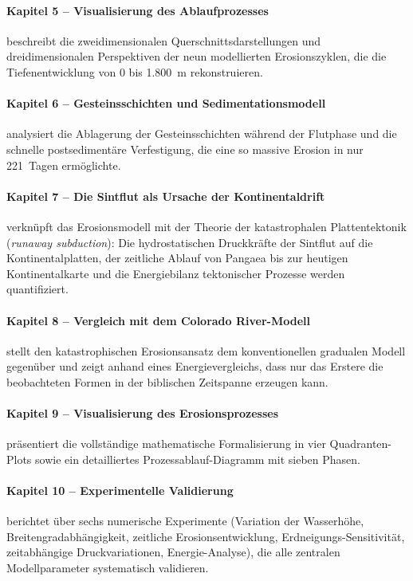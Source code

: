 ﻿\documentclass[12pt,a4paper]{report}
\begin{document}
\paragraph{Kapitel 5 -- Visualisierung des Ablaufprozesses}
beschreibt die zweidimensionalen Querschnittsdarstellungen und dreidimensionalen Perspektiven der neun modellierten Erosionszyklen, die die Tiefenentwicklung von 0 bis 1.800~m rekonstruieren.

\paragraph{Kapitel 6 -- Gesteinsschichten und Sedimentationsmodell}
analysiert die Ablagerung der Gesteinsschichten während der Flutphase und die schnelle postsedimentäre Verfestigung, die eine so massive Erosion in nur 221~Tagen ermöglichte.

\paragraph{Kapitel 7 -- Die Sintflut als Ursache der Kontinentaldrift}
verknüpft das Erosionsmodell mit der Theorie der katastrophalen Plattentektonik (\textit{runaway subduction}): Die hydrostatischen Druckkräfte der Sintflut auf die Kontinentalplatten, der zeitliche Ablauf von Pangaea bis zur heutigen Kontinentalkarte und die Energiebilanz tektonischer Prozesse werden quantifiziert.

\paragraph{Kapitel 8 -- Vergleich mit dem Colorado River-Modell}
stellt den katastrophischen Erosionsansatz dem konventionellen gradualen Modell gegenüber und zeigt anhand eines Energievergleichs, dass nur das Erstere die beobachteten Formen in der biblischen Zeitspanne erzeugen kann.

\paragraph{Kapitel 9 -- Visualisierung des Erosionsprozesses}
präsentiert die vollständige mathematische Formalisierung in vier Quadranten-Plots sowie ein detailliertes Prozessablauf-Diagramm mit sieben Phasen.

\paragraph{Kapitel 10 -- Experimentelle Validierung}
berichtet über sechs numerische Experimente (Variation der Wasserhöhe, Breitengradabhängigkeit, zeitliche Erosionsentwicklung, Erdneigungs-Sensitivität, zeitabhängige Druckvariationen, Energie-Analyse), die alle zentralen Modellparameter systematisch validieren.
\end{document}
